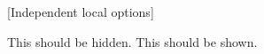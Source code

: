 \documentclass{article}
\begin{document}
[Independent local options]

\tBeginVerbatim{}
This  should be hidden.
This  should be shown.
\tEndVerbatim
\end{document}
